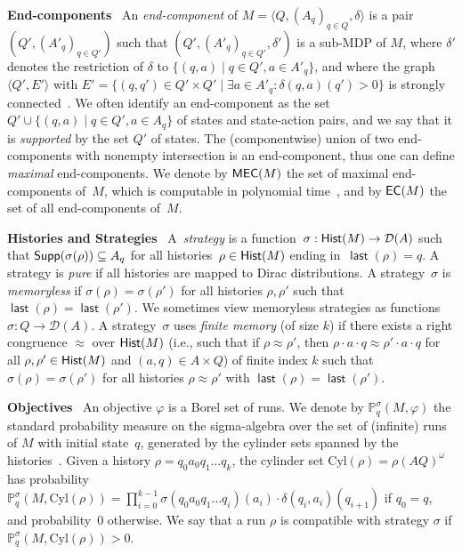 \documentclass[a4paper,USenglish,cleveref, autoref, thm-restate]{lipics-v2021}
\def\myparagraph#1{\noindent\textbf{#1}~}
\newcommand{\tuple}[1]{\langle #1 \rangle}
\newcommand{\Cyl}{\mathrm{Cyl}}
\newcommand*{\pr}{\mathbb{P}}
\newcommand\Supp{\textrm{\sf Supp}}
\newcommand\D{\mathcal{D}}
\renewcommand\H{{\sf Hist}}
\newcommand\ecs{\textrm{\sf EC}}
\newcommand\mecs{\textrm{\sf MEC}}
\newcommand{\last}{\operatorname{\mathsf{last}}}
\begin{document}
\smallskip
\myparagraph{End-components}
An \emph{end-component} of $M = \tuple{Q, (A_q)_{q \in Q}, \delta}$ is a 
pair $(Q',(A'_q)_{q \in Q'})$ such that $(Q',(A'_q)_{q \in Q'}, \delta')$
is a sub-MDP of $M$, where $\delta'$ denotes the restriction of $\delta$ to $\{(q,a) \mid q \in Q', a \in A'_q\}$,
and where the graph $\tuple{Q',E'}$
with $E'=\{(q,q') \in Q'\times Q' \mid \exists a \in A'_q: \delta(q,a)(q') > 0\}$
is strongly connected~\cite{DeAlfaro-phd97,BK08}.
We often identify an end-component as the 
set $Q' \cup \{(q,a) \mid q \in Q', a \in A_q\}$ of states and state-action pairs, 
and we say that it is \emph{supported} by the set $Q'$ of states. 
The (componentwise) union of two end-components with nonempty intersection is
an end-component, thus one can define \emph{maximal} end-components.
We denote by $\mecs(M)$ the set of maximal end-components of~$M$, 
which is computable in polynomial time~\cite{DeAlfaro-phd97},
and by $\ecs(M)$ the set of all end-components of~$M$.




\smallskip
\myparagraph{Histories and Strategies}
A~\emph{strategy} is a function~$\sigma: \H(M) \to \D(A)$ such that
$\Supp(\sigma(\rho)) \subseteq A_q$ for all histories~$\rho \in \H(M)$ ending in~$\last(\rho) = q$.
A strategy is \emph{pure} if all histories are mapped to Dirac distributions.
A strategy~$\sigma$ is \emph{memoryless} if $\sigma(\rho) = \sigma(\rho')$
for all histories $\rho, \rho'$ such that $\last(\rho) = \last(\rho')$.
We sometimes view memoryless strategies as functions $\sigma: Q \to \D(A)$.
A strategy~$\sigma$ uses \emph{finite memory} (of size $k$)
if there exists a right congruence $\approx$ over $\H(M)$ (i.e., such that
if $\rho \approx \rho'$, then $\rho \cdot a \cdot q  \approx \rho' \cdot a \cdot q$
for all $\rho, \rho' \in \H(M)$ and $(a,q) \in A \times Q$)
of finite index $k$ such that $\sigma(\rho) = \sigma(\rho')$
for all histories $\rho \approx \rho'$ with $\last(\rho) = \last(\rho')$.



\smallskip\myparagraph{Objectives}
An objective $\varphi$ is a Borel set of runs.
We denote by $\pr_{q}^\sigma(M, \varphi)$ the standard probability measure 
on the sigma-algebra over the set of (infinite) runs of $M$ with initial state~$q$, 
generated by the cylinder sets spanned by the histories~\cite{BK08}.
Given a history $\rho = q_0 a_0 q_1 \ldots q_k$, the cylinder set
$\Cyl(\rho) = \rho (AQ)^{\omega} $ has probability
\(
\pr_{q}^{\sigma}(M, \Cyl(\rho)) = \prod_{i=0}^{k-1} \sigma(q_0 a_0 q_1 \ldots q_i)(a_i) \cdot  \delta(q_i,a_i)(q_{i+1})
\) if $q_0 = q$, and probability~$0$ otherwise.
We say that a run $\rho$ is compatible with strategy $\sigma$ if $\pr_{q}^{\sigma}(M, \Cyl(\rho)) > 0$.
\end{document}
